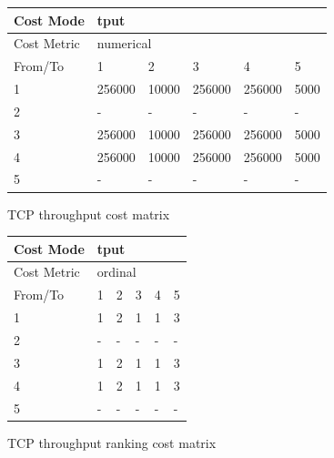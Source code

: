 \begin{figure}
\begin{subtable}{.65\linewidth}
        \begin{tabular}{|l|l|l|l|l|l|}
        \hline
        Cost Mode   & \multicolumn{5}{|l|}{tput}                       \\ \hline
        Cost Metric & \multicolumn{5}{|l|}{numerical}                  \\ \hline
        From/To     & 1         & 2     & 3        & 4        & 5      \\ \hline
        1           & 256000    & 10000 & 256000   & 256000   & 5000   \\ \hline
        2           & -         & -     & -        & -        & -      \\ \hline
        3           & 256000    & 10000 & 256000   & 256000   & 5000   \\ \hline
        4           & 256000    & 10000 & 256000   & 256000   & 5000   \\ \hline
        5           & -         & -     & -        & -        & -      \\ \hline
        \end{tabular}
    \caption{TCP throughput cost matrix}
    \end{subtable}
    \begin{subtable}{.30\linewidth}
        \centering
        \begin{tabular}{|l|l|l|l|l|l|}
        \hline
        Cost Mode   & \multicolumn{5}{|l|}{tput}                       \\ \hline
        Cost Metric & \multicolumn{5}{|l|}{ordinal}                    \\ \hline
        From/To     & 1         & 2     & 3        & 4        & 5      \\ \hline
        1           & 1         & 2     & 1        & 1        & 3      \\ \hline
        2           & -         & -     & -        & -        & -      \\ \hline
        3           & 1         & 2     & 1        & 1        & 3      \\ \hline
        4           & 1         & 2     & 1        & 1        & 3      \\ \hline
        5           & -         & -     & -        & -        & -      \\ \hline
        \end{tabular}
    \caption{TCP throughput ranking cost matrix}
    \end{subtable}
    \begin{subtable}{1\linewidth}

\end{subtable}
\end{figure}
